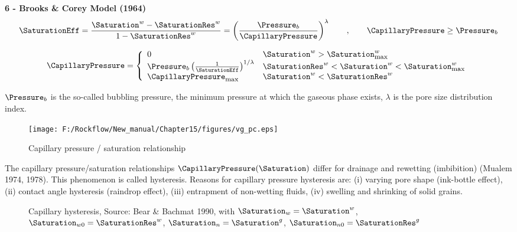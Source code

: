 \textbf{6 - Brooks \& Corey Model (1964)}
\vspace{5mm}
\begin{eqnarray}
\SaturationEff = \frac{\Saturation^w - \SaturationRes^w}{1 -
\SaturationRes^w} = \left( \frac{\Pressure_b}{\CapillaryPressure}
\right)^\lambda \qquad , \qquad \CapillaryPressure \ge \Pressure_b
\end{eqnarray}

\begin{eqnarray}
\CapillaryPressure = \left\{
\begin{array}{ll}
0 & \Saturation^w > \Saturation^w_{\mbox{\footnotesize max}}
\\
\Pressure_b \left(\frac{1}{\SaturationEff}\right)^{1/\lambda} &
\SaturationRes^w < \Saturation^w <
\Saturation^w_{\mbox{\footnotesize max}}
\\
{\CapillaryPressure}_{\mbox{\footnotesize max}} & \Saturation^w <
\SaturationRes^w
\end{array}
\right.
\end{eqnarray}

$\Pressure_b$ is the so-called bubbling pressure, the minimum
pressure at which the gaseous phase exists, $\lambda$ is the pore
size distribution index.

\begin{figure}[htb!]
\begin{center}
\footnotesize
\texttt{[image: F:/Rockflow/New\_manual/Chapter15/figures/vg\_pc.eps]}  %
\caption{Capillary pressure / saturation relationship}
\label{fig:}
\end{center}
\end{figure}


The capillary pressure/saturation relationships
$\CapillaryPressure(\Saturation)$ differ for drainage and
rewetting (imbibition) (Mualem 1974, 1978). This phenomenon is
called hysteresis. Reasons for capillary pressure hysteresis are:
(i) varying pore shape (ink-bottle effect), (ii) contact angle
hysteresis (raindrop effect), (iii) entrapment of non-wetting
fluids, (iv) swelling and shrinking of solid grains.

\begin{figure}[htb!]
\begin{center}
\footnotesize
\caption{Capillary hysteresis, Source: Bear \& Bachmat 1990, with
$\Saturation_{w} = \Saturation^w$, $\Saturation_{w0} =
\SaturationRes^w$, $\Saturation_{n} = \Saturation^g$,
$\Saturation_{n0} = \SaturationRes^g$ } \label{fig:}
\end{center}
\end{figure}
%

